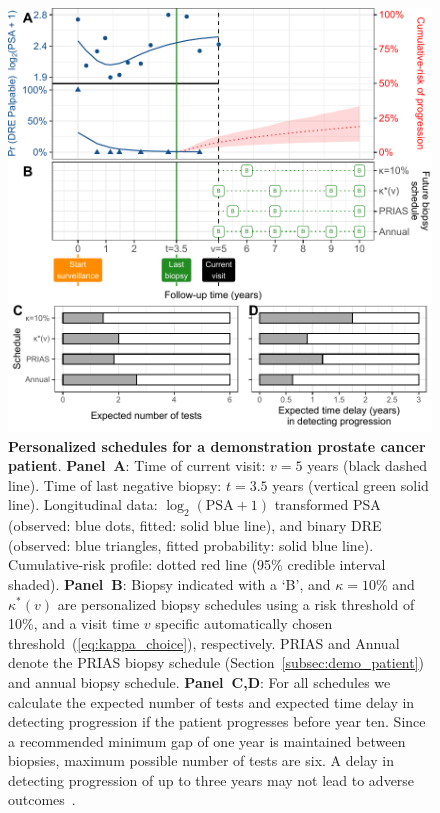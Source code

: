 \begin{figure}
\centerline{\includegraphics{images/demo_schedule.pdf}}
\caption{\small{\textbf{Personalized schedules for a demonstration prostate cancer patient}. \textbf{Panel~A}: Time of current visit: $v=5$ years (black dashed line). Time of last negative biopsy: $t=3.5$ years (vertical green solid line). Longitudinal data: $\log_2(\mbox{PSA} + 1)$ transformed PSA (observed: blue dots, fitted: solid blue line), and binary DRE (observed: blue triangles, fitted probability: solid blue line). Cumulative-risk profile: dotted red line (95\% credible interval shaded). \textbf{Panel~B}: Biopsy indicated with a `B', and \textbf{$\kappa=10\%$} and \textbf{$\kappa^*(v)$} are personalized biopsy schedules using a risk threshold of 10\%, and a visit time $v$ specific automatically chosen threshold~(\ref{eq:kappa_choice}), respectively. PRIAS and Annual denote the PRIAS biopsy schedule (Section~\ref{subsec:demo_patient}) and annual biopsy schedule. \textbf{Panel~C,D}: For all schedules we calculate the expected number of tests and expected time delay in detecting progression if the patient progresses before year ten. Since a recommended minimum gap of one year is maintained between biopsies, maximum possible number of tests are six. A delay in detecting progression of up to three years may not lead to adverse outcomes~\citep{carvalho}.}}
\label{fig:demo_schedule}
\end{figure}

